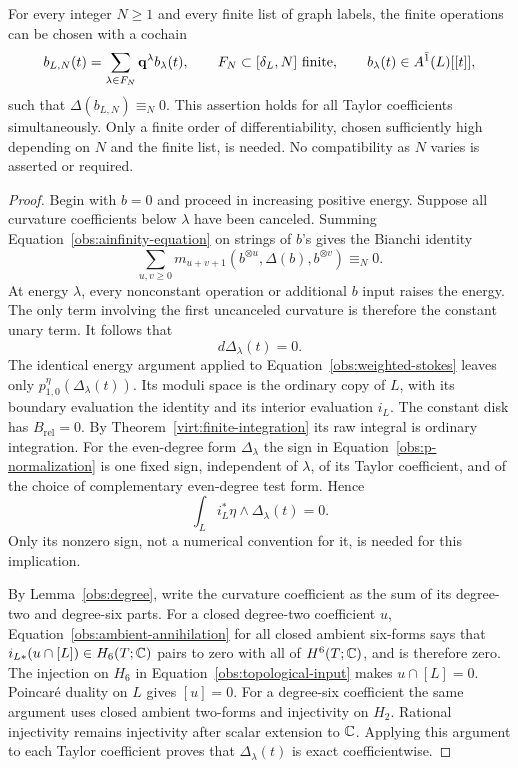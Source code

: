 \begin{theorem}
\label{obs:finite-bounding}
For every integer $N\ge1$ and every finite list of graph labels, the
finite operations can be chosen with a cochain
\[
 b_{L,N}(t)=\sum_{\lambda\in F_N}\mathbf q^\lambda b_\lambda(t),
 \qquad F_N\subset[\delta_L,N]\ \text{finite},\qquad
 b_\lambda(t)\in A^{\bar1}(L)[[t]],
\]
such that $\Delta(b_{L,N})\equiv_N0$.
This assertion holds for all
Taylor coefficients simultaneously.  Only a finite order of
differentiability, chosen sufficiently high depending on $N$
and the finite list, is needed.  No compatibility as $N$
varies is asserted or required.
\end{theorem}

\begin{proof}
Begin with $b=0$ and proceed in increasing positive energy.
Suppose all curvature coefficients below $\lambda$ have
been canceled.  Summing
Equation~\eqref{obs:ainfinity-equation} on strings of $b$'s
gives the Bianchi identity
\[
 \sum_{u,v\ge0}m_{u+v+1}(b^{\otimes u},\Delta(b),
                              b^{\otimes v})\equiv_N0.
\]
At energy $\lambda$, every nonconstant operation or additional
$b$ input raises the energy.  The only term involving the
first uncanceled curvature is therefore the constant unary
term.  It follows that
\begin{equation}
 \label{obs:closed-obstruction}
 d\Delta_\lambda(t)=0.
\end{equation}
The identical energy argument applied to
Equation~\eqref{obs:weighted-stokes} leaves only
$p_{1,0}^\eta(\Delta_\lambda(t))$.  Its moduli space is the
ordinary copy of $L$, with its boundary evaluation the
identity and its interior evaluation $i_L$.
The constant disk has $B_{\mathrm{rel}}=0$.
By Theorem~\ref{virt:finite-integration} its raw integral is
ordinary integration.  For the even-degree form
$\Delta_\lambda$ the sign in
Equation~\eqref{obs:p-normalization} is one fixed sign,
independent of $\lambda$, of its Taylor coefficient, and of
the choice of complementary even-degree test form.  Hence
\begin{equation}
 \label{obs:ambient-annihilation}
 \int_Li_L^*\eta\wedge\Delta_\lambda(t)=0.
\end{equation}
Only its nonzero sign, not a numerical convention for it, is
needed for this implication.

By Lemma~\ref{obs:degree}, write the curvature coefficient as
the sum of its degree-two and degree-six parts.
For a closed degree-two coefficient $u$, Equation~\eqref{obs:ambient-annihilation}
for all closed ambient six-forms says that
$i_{L*}(u\cap[L])\in H_6(T;\mathbb C)$ pairs to zero with all of
$H^6(T;\mathbb C)$, and is therefore zero.  The injection on $H_6$
in Equation~\eqref{obs:topological-input} makes $u\cap[L]=0$.
Poincar\'e duality on
$L$ gives $[u]=0$.  For a degree-six coefficient the same
argument uses closed ambient two-forms and injectivity on
$H_2$.  Rational injectivity remains injectivity after scalar
extension to $\mathbb C$.  Applying this argument to each Taylor
coefficient proves that $\Delta_\lambda(t)$ is exact
coefficientwise.


\end{proof}
